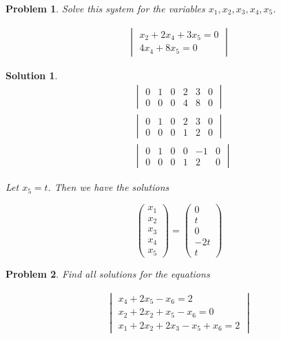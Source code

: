 \documentclass{article}
\newtheorem{problem}{Problem}
\newtheorem*{solution}{Solution}
\begin{document}
\begin{problem}

Solve this system for the variables $x_{1}, x_{2}, x_{3}, x_{4}, x_{5}$.

\begin{align*}
\begin{vmatrix}
x_{2} + 2x_{4} + 3x_{5} = 0 \\
4x_{4} + 8x_{5} = 0
\end{vmatrix}
\end{align*}

\end{problem}

\begin{solution}
\begin{align*}
&\begin{vmatrix}
0 & 1 & 0 & 2 & 3 & 0 \\
0 & 0 & 0 & 4 & 8 & 0 
\end{vmatrix} \\
&\begin{vmatrix}
0 & 1 & 0 & 2 & 3 & 0 \\
0 & 0 & 0 & 1 & 2 & 0 
\end{vmatrix} \\
&\begin{vmatrix}
0 & 1 & 0 & 0 & -1 & 0 \\
0 & 0 & 0 & 1 & 2 & 0 
\end{vmatrix}
\end{align*}

Let $x_{5} = t$. Then we have the solutions

\begin{equation*}
\begin{pmatrix}
x_{1} \\ x_{2} \\ x_{3} \\ x_{4} \\ x_{5}
\end{pmatrix}
=
\begin{pmatrix}
0 \\ t \\ 0 \\ -2t \\ t
\end{pmatrix}
\end{equation*}


\end{solution}

\begin{problem}

Find all solutions for the equations

\begin{align*}
\begin{vmatrix}
x_{4} + 2x_{5} - x_{6} = 2 \\
x_{2} + 2x_{2} + x_{5} - x_{6} = 0 \\
x_{1} + 2x_{2} + 2x_{3} - x_{5} + x_{6} = 2
\end{vmatrix}
\end{align*}

\end{problem}
\end{document}
